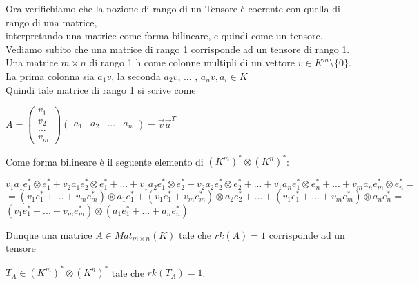 \documentclass[a4paper,12pt]{article}
\theoremstyle{def}
\theoremstyle{prop}
\theoremstyle{esempio}
\theoremstyle{dimostrazione}
\theoremstyle{teo}
\theoremstyle{osservazione}
\begin{document}
Ora verifichiamo che la nozione di rango di un Tensore è coerente con quella di rango di una matrice,\\
interpretando una matrice come forma bilineare, e quindi come un tensore.\\
Vediamo subito che una matrice di rango 1 corrisponde ad un tensore di rango 1.\\
Una matrice \(m \times n\) di rango 1 h come colonne multipli di un vettore \(v \in K^m \setminus \{0\}\).\\
La prima colonna sia \(a_1v\), la seconda \(a_2v\), ... , \(a_nv, a_i \in K\)\\
Quindi tale matrice di rango 1 si scrive come
\begin{center}
	\(A = \begin{pmatrix}
		v_1 \\
		v_2 \\
		... \\
		v_m
	\end{pmatrix}
	\begin{pmatrix}
		a_1 & a_2 & ... & a_n
	\end{pmatrix} = \overrightarrow{v} \overrightarrow{a}^T\)\\
\end{center}
Come forma bilineare è il seguente elemento di \((K^m)^* \otimes (K^n)^*\):
\begin{center}
	\(v_1 a_1 e_1^* \otimes e_1^* + v_2 a_1 e_2^* \otimes e_1^* + ... + v_1 a_2 e_1^* \otimes e_2^* + v_2 a_2 e_2^* \otimes e_2^* + ... + v_1 a_n e_1^* \otimes e_n^* + ... + v_m a_n e_m^* \otimes e_n^* =\)\\
	\(= (v_1 e_1^* + ... + v_m e_m^*) \otimes a_1 e_1^* + (v_1 e_1^* + v_m e_m^*) \otimes a_2 e_2^* + ... + (v_1 e_1^* + ... + v_m e_m^*) \otimes a_n e_n^* = \)\\
	\((v_1 e_1^* + ... + v_m e_m^*) \otimes (a_1 e_1^* + ... + a_n e_n^*)\)
\end{center}
Dunque una matrice \(A \in Mat_{m \times n} (K)\) tale che \(rk(A) = 1\) corrisponde ad un tensore
\begin{center}
	\(T_A \in (K^m)^* \otimes (K^n)^*\) tale che \(rk(T_A) = 1\).
\end{center}
\end{document}
